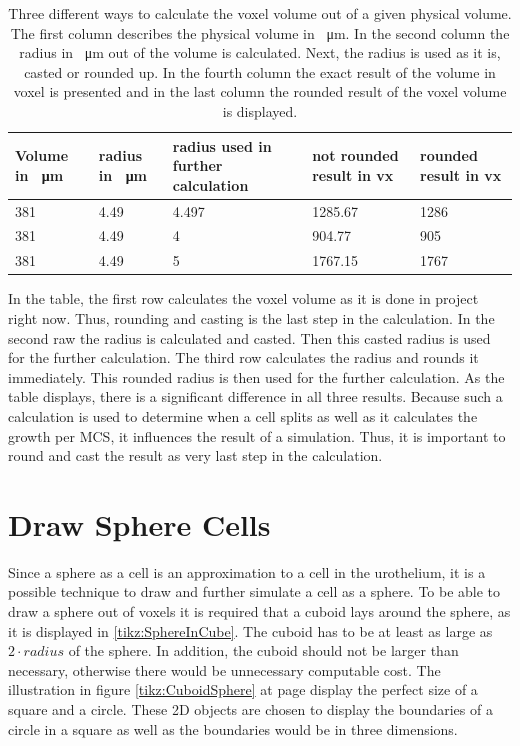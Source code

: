 \begin{table}[h]
\centering
\caption{Three different ways to calculate the voxel volume out of a given physical volume. The first column describes the physical volume in \SI{}{\micro\metre}. In the second column the radius in \SI{}{\micro\metre} out of the volume is calculated. Next, the radius is used as it is, casted or rounded up. In the fourth column the exact result of the volume in voxel is presented and in the last column the rounded result of the voxel volume is displayed.}
\renewcommand{\arraystretch}{1.5}
	\begin{tabularx}{\textwidth}{X||X||X||X||X}
		Volume in \SI{}{\micro\metre} & radius in \SI{}{\micro\metre} & radius used in further calculation & not rounded result in vx & rounded result in vx  \\
		\hline
		381 & 4.49 & 4.497 & 1285.67 & 1286 \\
		
		381 & 4.49 & 4 & 904.77 & 905\\
		
		381 & 4.49 & 5 & 1767.15 & 1767\\

	\end{tabularx}
	\label{tbl:Approximation error}
\end{table}

In the table, the first row calculates the voxel volume as it is done in project right now. Thus, rounding and casting is the last step in the calculation. In the second raw the radius is calculated and casted. Then this casted radius is used for the further calculation. The third row calculates the radius and rounds it immediately. This rounded radius is then used for the further calculation. \newline
As the table displays, there is a significant difference in all three results. Because such a calculation is used to determine when a cell splits as well as it calculates the growth per \ac{MCS}, it influences the result of a simulation. Thus, it is important to round and cast the result as very last step in the calculation.




\section{Draw Sphere Cells}\label{sec:DrawSphereCells}
Since a sphere as a cell is an approximation to a cell in the urothelium, it is a possible technique to draw and further simulate a cell as a sphere. \newline 
To be able to draw a sphere out of voxels it is required that a cuboid lays around the sphere, as it is displayed in \ref{tikz:SphereInCube}. The cuboid has to be at least as large as $2 \cdot radius$ of the sphere. In addition, the cuboid should not be larger than necessary, otherwise there would be unnecessary computable cost. The illustration in figure \ref{tikz:CuboidSphere} at page \pageref{tikz:CuboidSphere} display the perfect size of a square and a circle. These 2D objects are chosen to display the boundaries of a circle in a square as well as the boundaries would be in three dimensions.


